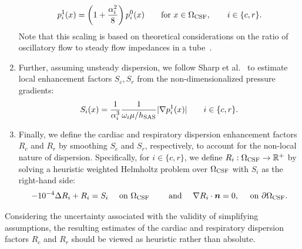 \documentclass[fleqn,10pt]{wlscirep}
\begin{document}
\begin{enumerate}[label=\roman*)]
\begin{equation}
    p^1_i(x) = \left ( 1 + \frac{\alpha_i^2}{8} \right ) p_i^0(x)
    \qquad \text{for } x \in \Omega_{\rm CSF}, \qquad i \in \{c, r\}.
  \end{equation}
  Note that this scaling is based on theoretical considerations on the
  ratio of oscillatory flow to steady flow impedances in a
  tube~\cite[Chap.~4.3.]{van1998cardiovascular}.
\item
  Further, assuming unsteady dispersion, we follow Sharp et
  al.~\cite{sharp2019dispersion} to estimate local enhancement factors
  $S_c, S_r$ from the non-dimensionalized pressure gradients:
  \begin{equation}
    S_i(x) = \frac{1}{\alpha_i^3} \frac{1}{\omega_i \mu/h_{\rm SAS}} | \nabla p_i^1(x) |
    \qquad i \in \{c, r\}.
  \end{equation}
\item
  Finally, we define the cardiac and respiratory dispersion
  enhancement factors $R_c$ and $R_r$ by smoothing $S_c$ and $S_r$,
  respectively, to account for the non-local nature of
  dispersion. Specifically, for $i \in \{c, r\}$, we define $R_i :
  \Omega_{\rm CSF} \rightarrow \mathbb{R}^{+}$ by solving a heuristic weighted
  Helmholtz problem over $\Omega_{\rm CSF}$ with $S_i$ as the
  right-hand side:
  \begin{equation}
    - 10^{-4} \Delta R_i + R_i
    = S_i \quad \text{ on } \Omega_{\rm CSF}
    \qquad \text{ and } \quad
    \nabla R_i \cdot \bm n = 0, \quad \text{ on } \partial \Omega_{\rm CSF} .
\end{equation}
\end{enumerate}
Considering the uncertainty associated with the validity of
simplifying assumptions, the resulting estimates of the cardiac and
respiratory dispersion factors $R_c$ and $R_r$ 
should be viewed as heuristic rather than absolute.


\end{document}
